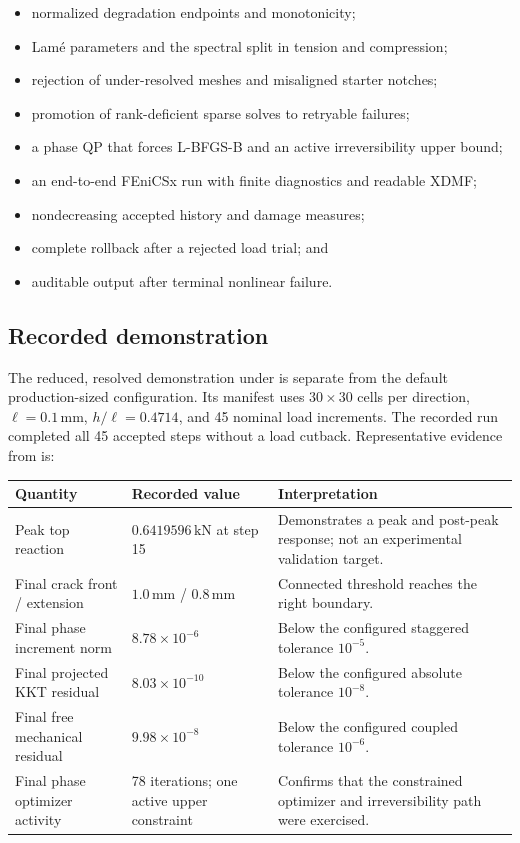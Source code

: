 \documentclass[11pt,a4paper]{article}
\begin{document}
\begin{itemize}
  \item normalized degradation endpoints and monotonicity;
  \item Lam\'e parameters and the spectral split in tension and compression;
  \item rejection of under-resolved meshes and misaligned starter notches;
  \item promotion of rank-deficient sparse solves to retryable failures;
  \item a phase QP that forces L-BFGS-B and an active irreversibility upper bound;
  \item an end-to-end FEniCSx run with finite diagnostics and readable XDMF;
  \item nondecreasing accepted history and damage measures;
  \item complete rollback after a rejected load trial; and
  \item auditable output after terminal nonlinear failure.
\end{itemize}

\subsection{Recorded demonstration}

The reduced, resolved demonstration under  is separate from
the default production-sized configuration. Its manifest uses $30\times30$
cells per direction, $\ell=0.1\,\mathrm{mm}$, $h/\ell=0.4714$, and 45 nominal
load increments. The recorded run completed all 45 accepted steps without a
load cutback. Representative evidence from  is:

\begin{tabularx}{\textwidth}{@{}L{59mm}L{45mm}Y@{}}
\toprule
\textbf{Quantity} & \textbf{Recorded value} & \textbf{Interpretation} \\
\midrule
Peak top reaction & $0.6419596\,\mathrm{kN}$ at step 15 & Demonstrates a peak
and post-peak response; not an experimental validation target. \\
Final crack front / extension & $1.0\,\mathrm{mm}$ / $0.8\,\mathrm{mm}$ &
Connected threshold reaches the right boundary. \\
Final phase increment norm & $8.78\times10^{-6}$ & Below the configured
staggered tolerance $10^{-5}$. \\
Final projected KKT residual & $8.03\times10^{-10}$ & Below the configured
absolute tolerance $10^{-8}$. \\
Final free mechanical residual & $9.98\times10^{-8}$ & Below the configured
coupled tolerance $10^{-6}$. \\
Final phase optimizer activity & 78 iterations; one active upper constraint &
Confirms that the constrained optimizer and irreversibility path were exercised. \\
\bottomrule
\end{tabularx}
\end{document}
